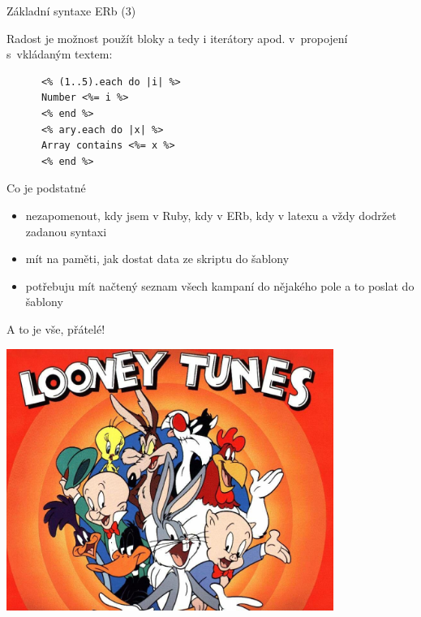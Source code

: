 \documentclass{beamer}
\begin{document}
\begin{frame}[fragile]{Základní syntaxe ERb (3)}
  \begin{block}{ }
    Radost je možnost použít bloky a tedy i iterátory apod. v~propojení s~vkládaným textem:
    \scriptsize
    \begin{verbatim}
      <% (1..5).each do |i| %>
      Number <%= i %>
      <% end %>
      <% ary.each do |x| %>
      Array contains <%= x %>
      <% end %>
    \end{verbatim}
  \end{block}
\end{frame}

\begin{frame}{Co je podstatné}
  \begin{itemize}
    \item nezapomenout, kdy jsem v Ruby, kdy v ERb, kdy v latexu a vždy dodržet zadanou syntaxi
    \item mít na paměti, jak dostat data ze skriptu do šablony
    \item potřebuju mít načtený seznam všech kampaní do nějakého pole a to poslat do šablony
  \end{itemize}
\end{frame}

\begin{frame}{A to je vše, přátelé!}
  \begin{center}
    \includegraphics[width=0.8\textwidth]{looney_tunes}
  \end{center}
\end{frame}
\end{document}
